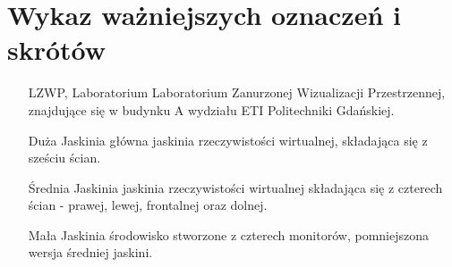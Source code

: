 \chapter*{Wykaz ważniejszych oznaczeń i skrótów}

\begin{itemize}
    \item [LZWP, Laboratorium] Laboratorium Zanurzonej Wizualizacji Przestrzennej, znajdujące się w budynku A wydziału ETI Politechniki Gdańskiej.
    \item [Duża Jaskinia] główna jaskinia rzeczywistości wirtualnej, składająca się z sześciu ścian.
    \item [Średnia Jaskinia] jaskinia rzeczywistości wirtualnej składająca się z czterech ścian - prawej, lewej, frontalnej oraz dolnej.
    \item [Mała Jaskinia] środowisko stworzone z czterech monitorów, pomniejszona wersja średniej jaskini.
\end{itemize}
